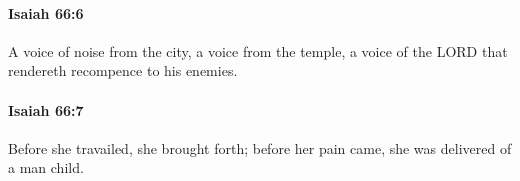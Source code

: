 		\paragraph{Isaiah 66:6} %
			\label{ISAIAH-66-6}

			A voice of noise from the city, a voice from the temple, a voice of the LORD that rendereth recompence to his enemies.


		\paragraph{Isaiah 66:7} %
			\label{ISAIAH-66-7}

			Before she travailed, she brought forth; before her pain came, she was delivered of a man child.


